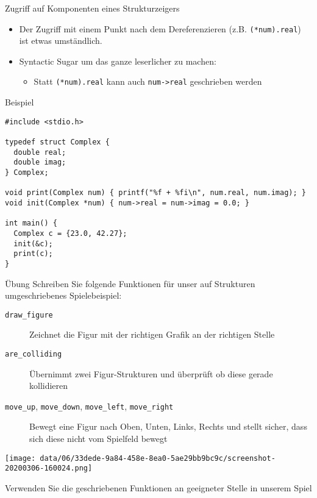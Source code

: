 \documentclass[presentation]{beamer}
\begin{document}
\begin{frame}[label={sec:org3fe06e1},fragile]{Zugriff auf Komponenten eines Strukturzeigers}
 \begin{itemize}
\item Der Zugriff mit einem Punkt nach dem Dereferenzieren (z.B.
{\color{solarizedYellow}\verb!(*num).real!}) ist etwas umständlich.
\item Syntactic Sugar um das ganze leserlicher zu machen:
\begin{itemize}
\item Statt {\color{solarizedYellow}\verb!(*num).real!} kann auch {\color{solarizedYellow}\verb!num->real!} geschrieben werden
\end{itemize}
\end{itemize}
\begin{exampleblock}{Beispiel}
\begin{verbatim}
#include <stdio.h>

typedef struct Complex {
  double real;
  double imag;
} Complex;

void print(Complex num) { printf("%f + %fi\n", num.real, num.imag); }
void init(Complex *num) { num->real = num->imag = 0.0; }

int main() {
  Complex c = {23.0, 42.27};
  init(&c);
  print(c);
}
\end{verbatim}
\end{exampleblock}
\end{frame}
\begin{frame}[label={sec:org5e59f58},fragile]{Übung}
 Schreiben Sie folgende Funktionen für unser auf Strukturen umgeschriebenes Spielebeispiel:
\begin{description}
\item[{\color{solarizedYellow}\texttt{draw\_figure}}] Zeichnet die Figur mit der richtigen Grafik an der richtigen Stelle
\item[{\color{solarizedYellow}\texttt{are\_colliding}}] Übernimmt zwei Figur-Strukturen und überprüft ob diese gerade kollidieren
\item[{\color{solarizedYellow}\texttt{move\_up}}, {\color{solarizedYellow}\texttt{move\_down}}, {\color{solarizedYellow}\texttt{move\_left}}, {\color{solarizedYellow}\texttt{move\_right}}] Bewegt eine
Figur nach Oben, Unten, Links, Rechts und stellt sicher, dass
sich diese nicht vom Spielfeld bewegt
\end{description}
\begin{center}
\texttt{[image: data/06/33dede-9a84-458e-8ea0-5ae29bb9bc9c/screenshot-20200306-160024.png]}
\end{center}
Verwenden Sie die geschriebenen Funktionen an geeigneter Stelle in
unserem Spiel
\end{frame}
\end{document}
